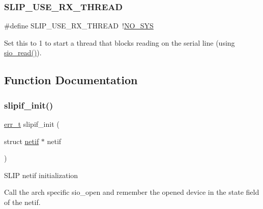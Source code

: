 \subsubsection{\texorpdfstring{S\+L\+I\+P\+\_\+\+U\+S\+E\+\_\+\+R\+X\+\_\+\+T\+H\+R\+E\+AD}{SLIP\_USE\_RX\_THREAD}}
{\footnotesize\ttfamily \#define S\+L\+I\+P\+\_\+\+U\+S\+E\+\_\+\+R\+X\+\_\+\+T\+H\+R\+E\+AD~!\hyperlink{openmote-cc2538_2lwip_2test_2unit_2lwipopts_8h_ae00ba99de94a5bf84d832be8976df59b}{N\+O\+\_\+\+S\+YS}}

Set this to 1 to start a thread that blocks reading on the serial line (using \hyperlink{native_2lwip_2src_2include_2lwip_2sio_8h_ac5a6563ee5f12459451010139a04a03b}{sio\+\_\+read()}). 

\subsection{Function Documentation}
\mbox{\label{openmote-cc2538_2lwip_2src_2include_2netif_2slipif_8h_a687973ba82dab13a5b9d38d7399aeee3}} 
\subsubsection{\texorpdfstring{slipif\+\_\+init()}{slipif\_init()}}
{\footnotesize\ttfamily \hyperlink{group__infrastructure__errors_gaf02d9da80fd66b4f986d2c53d7231ddb}{err\+\_\+t} slipif\+\_\+init (\begin{DoxyParamCaption}\item[{struct \hyperlink{structnetif}{netif} $\ast$}]{netif }\end{DoxyParamCaption})}

S\+L\+IP netif initialization

Call the arch specific sio\+\_\+open and remember the opened device in the state field of the netif.



